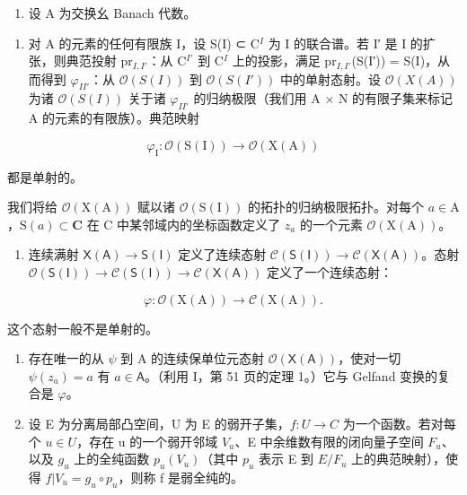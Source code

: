 \begin{enumerate}
\def\labelenumi{¶ \arabic{enumi})}
\setcounter{enumi}{17}
\tightlist
\item
  设 A 为交换幺 Banach 代数。
\end{enumerate}

\begin{enumerate}
\def\labelenumi{\alph{enumi})}
\tightlist
\item
  对 A 的元素的任何有限族 I，设 S(I) ⊂ C\(^{I}\) 为 I 的联合谱。若 I′ 是 I 的扩张，则典范投射 pr\(_{I,I'}\)：从 C\(^{I'}\) 到 C\(^{I}\) 上的投影，满足 pr\(_{I,I'}\)(S(I′)) = S(I)，从而得到 \(\varphi_{II'}\)：从 \(\mathcal{O}(S(I))\) 到 \(\mathcal{O}(S(I'))\) 中的单射态射。设 \(\mathcal{O}(X(A))\) 为诸 \(\mathcal{O}(S(I))\) 关于诸 \(\varphi_{II'}\) 的归纳极限（我们用 A × N 的有限子集来标记 A 的元素的有限族）。典范映射
\end{enumerate}

\[
\varphi_ {\mathrm{I}} \colon \mathcal {O} (\mathrm{S} (\mathrm{I})) \longrightarrow \mathcal {O} (\mathrm{X} (\mathrm{A}))
\]

都是单射的。

我们将给 \(\mathcal{O}(\mathrm{X(A)})\) 赋以诸 \(\mathcal{O}(\mathrm{S(I)})\) 的拓扑的归纳极限拓扑。对每个 \(a \in \mathrm{A}\)，\(\mathrm{S}(a) \subset \mathbf{C}\) 在 C 中某邻域内的坐标函数定义了 \(z_a\) 的一个元素 \(\mathcal{O}(\mathrm{X(A)})\)。

\begin{enumerate}
\def\labelenumi{\alph{enumi})}
\setcounter{enumi}{1}
\tightlist
\item
  连续满射 \(\mathsf{X}(\mathsf{A}) \to \mathsf{S}(\mathsf{I})\) 定义了连续态射 \(\mathcal{C}(\mathsf{S}(\mathsf{I})) \to \mathcal{C}(\mathsf{X}(\mathsf{A}))\)。态射 \(\mathcal{O}(\mathsf{S}(\mathsf{I})) \to \mathcal{C}(\mathsf{S}(\mathsf{I})) \to \mathcal{C}(\mathsf{X}(\mathsf{A}))\) 定义了一个连续态射：
\end{enumerate}

\[
\varphi \colon \mathcal {O} (\mathrm{X} (\mathrm{A})) \longrightarrow \mathcal {C} (\mathrm{X} (\mathrm{A})).
\]

这个态射一般不是单射的。

\begin{enumerate}
\def\labelenumi{\alph{enumi})}
\setcounter{enumi}{2}
\item
  存在唯一的从 \(\psi\) 到 A 的连续保单位元态射 \(\mathcal{O}(\mathsf{X}(\mathsf{A}))\)，使对一切 \(\psi(z_a) = a\) 有 \(a \in \mathsf{A}\)。（利用 I，第 51 页的定理 1。）它与 Gelfand 变换的复合是 \(\varphi\)。
\item
  设 E 为分离局部凸空间，U 为 E 的弱开子集，\(f: U \to C\) 为一个函数。若对每个 \(u \in U\)，存在 u 的一个弱开邻域 \(V_u\)、E 中余维数有限的闭向量子空间 \(F_u\)、以及 \(g_u\) 上的全纯函数 \(p_u(V_u)\)（其中 \(p_u\) 表示 E 到 \(E/F_u\) 上的典范映射），使得 \(f|V_u = g_u \circ p_u\)，则称 f 是弱全纯的。
\end{enumerate}

